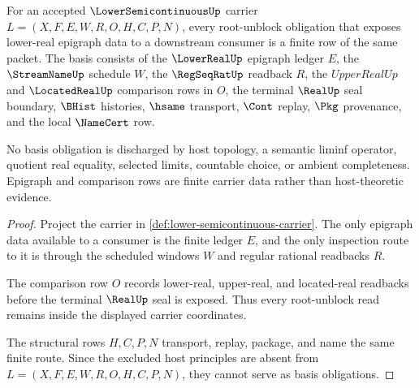 \begin{theorem}
\label{thm:lowersemicontinuous-namecert-obligation-basis}
For an accepted $\LowerSemicontinuousUp$ carrier
$L=(X,F,E,W,R,O,H,C,P,N)$, every root-unblock obligation that exposes
lower-real epigraph data to a downstream consumer is a finite row of the same
packet. The basis consists of the $\LowerRealUp$ epigraph ledger $E$, the
$\StreamNameUp$ schedule $W$, the $\RegSeqRatUp$ readback $R$, the
$UpperRealUp$ and $\LocatedRealUp$ comparison rows in $O$, the terminal
$\RealUp$ seal boundary, $\BHist$ histories, $\hsame$ transport, $\Cont$
replay, $\Pkg$ provenance, and the local $\NameCert$ row.

No basis obligation is discharged by host topology, a semantic liminf
operator, quotient real equality, selected limits, countable choice, or
ambient completeness. Epigraph and comparison rows are finite carrier data
rather than host-theoretic evidence.
\end{theorem}
\begin{proof}
Project the carrier in \autoref{def:lower-semicontinuous-carrier}. The only
epigraph data available to a consumer is the finite ledger $E$, and the only
inspection route to it is through the scheduled windows $W$ and regular
rational readbacks $R$.

The comparison row $O$ records lower-real, upper-real, and located-real
readbacks before the terminal $\RealUp$ seal is exposed. Thus every
root-unblock read remains inside the displayed carrier coordinates.

The structural rows $H,C,P,N$ transport, replay, package, and name the same
finite route. Since the excluded host principles are absent from
$L=(X,F,E,W,R,O,H,C,P,N)$, they cannot serve as basis obligations.
\end{proof}

